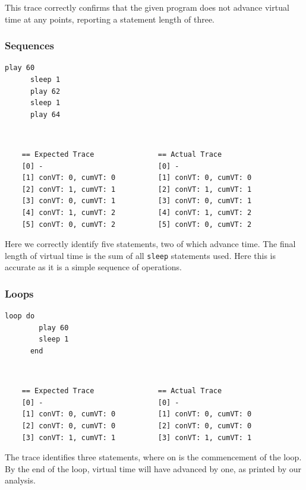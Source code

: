 \documentclass[11pt, abstracton, twoside, titlepage=true]{scrartcl}
\begin{document}
This trace correctly confirms that the given program does not advance virtual time 
at any points, reporting a statement length of three.

\subsubsection{Sequences}
\begin{minipage}{\textwidth}
	\begin{lstlisting}[style = sonicpi]
      play 60
      sleep 1
      play 62
      sleep 1
      play 64
	\end{lstlisting}
\end{minipage}
\\
\begin{lstlisting}
    == Expected Trace               == Actual Trace
    [0] -                           [0] -
    [1] conVT: 0, cumVT: 0          [1] conVT: 0, cumVT: 0
    [2] conVT: 1, cumVT: 1          [2] conVT: 1, cumVT: 1
    [3] conVT: 0, cumVT: 1          [3] conVT: 0, cumVT: 1
    [4] conVT: 1, cumVT: 2          [4] conVT: 1, cumVT: 2
    [5] conVT: 0, cumVT: 2          [5] conVT: 0, cumVT: 2
\end{lstlisting}

Here we correctly identify five statements, two of which advance time. The final 
length of virtual time is the sum of all \texttt{sleep} statements used. Here this 
is accurate as it is a simple sequence of operations.

\subsubsection{Loops}
\begin{minipage}{\textwidth}
	\begin{lstlisting}[style = sonicpi]
      loop do
        play 60
        sleep 1
      end
	\end{lstlisting}
\end{minipage}
\\
\begin{lstlisting}
    == Expected Trace               == Actual Trace
    [0] -                           [0] -
    [1] conVT: 0, cumVT: 0          [1] conVT: 0, cumVT: 0
    [2] conVT: 0, cumVT: 0          [2] conVT: 0, cumVT: 0
    [3] conVT: 1, cumVT: 1          [3] conVT: 1, cumVT: 1
\end{lstlisting}

The trace identifies three statements, where on is the commencement of the loop. 
By the end of the loop, virtual time will have advanced by one, as printed by 
our analysis.
\end{document}
